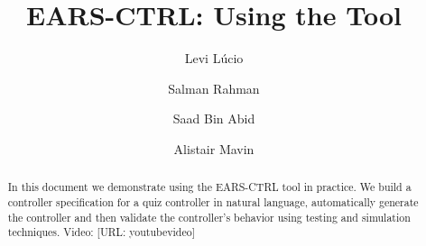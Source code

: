 \documentclass{llncs}
\begin{document}
%
\frontmatter          %

\mainmatter              %
%
\title{EARS-CTRL: Using the Tool}
%
\titlerunning{}  %
%
\author{Levi L\'ucio \and Salman Rahman
 \and Saad Bin Abid \and Alistair Mavin}
%
\authorrunning{} %
%
\tocauthor{}
%

\maketitle              %
\vspace{-.5cm} 
\begin{abstract}
In this document we demonstrate using the \textsf{EARS-CTRL} tool in practice.
We build a controller specification for a quiz controller in natural language,
automatically generate the controller and then validate the controller's
behavior using testing and simulation techniques. Video: [URL:
youtubevideo]
\end{abstract}
 
 

\newpage


\end{document}
